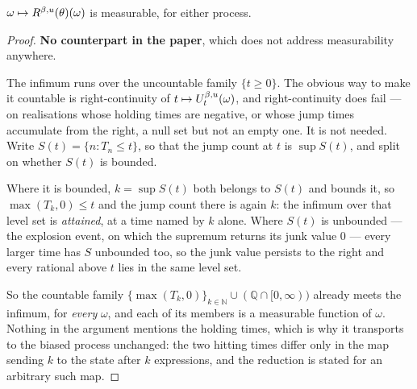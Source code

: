 \begin{lemma}
  \label{aux-measurable-hitting}
  \leanok
  $\omega \mapsto R^{\beta,u}(\theta)(\omega)$ is measurable, for either process.
\end{lemma}
\begin{proof}
  \leanok
  \textbf{No counterpart in the paper}, which does not address measurability
  anywhere.

  The infimum runs over the uncountable family $\{t \ge 0\}$.  The obvious way
  to make it countable is right-continuity of $t \mapsto U^{\beta,u}_t(\omega)$,
  and right-continuity does fail --- on realisations whose holding times are
  negative, or whose jump times accumulate from the right, a null set but not
  an empty one.  It is not needed.  Write $S(t) = \{n : T_n \le t\}$, so that
  the jump count at $t$ is $\sup S(t)$, and split on whether $S(t)$ is
  bounded.

  Where it is bounded, $k = \sup S(t)$ both belongs to $S(t)$ and bounds it,
  so $\max(T_k, 0) \le t$ and the jump count there is again $k$: the infimum
  over that level set is \emph{attained}, at a time named by $k$ alone.  Where
  $S(t)$ is unbounded --- the explosion event, on which the supremum returns
  its junk value $0$ --- every larger time has $S$ unbounded too, so the junk
  value persists to the right and every rational above $t$ lies in the same
  level set.

  So the countable family $\{\max(T_k,0)\}_{k \in \mathbb{N}} \cup
  (\mathbb{Q} \cap [0,\infty))$ already meets the infimum, for \emph{every}
  $\omega$, and each of its members is a measurable function of $\omega$.
  Nothing in the argument mentions the holding times, which is why it
  transports to the biased process unchanged: the two hitting times differ only
  in the map sending $k$ to the state after $k$ expressions, and the reduction
  is stated for an arbitrary such map.
\end{proof}

